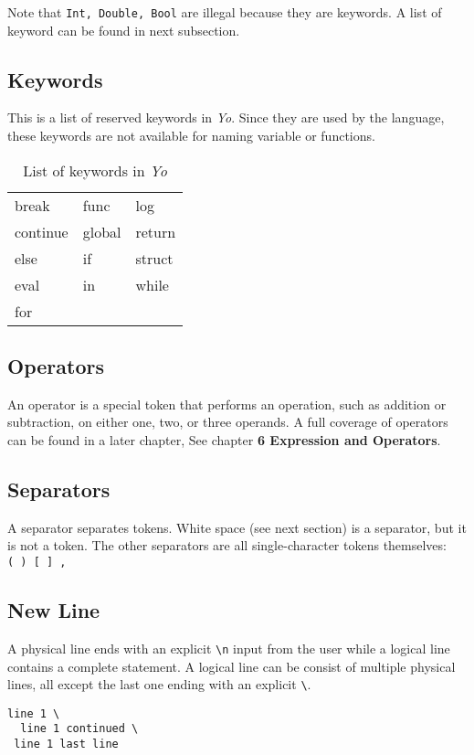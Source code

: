\documentclass[11pt]{article}
\begin{document}
Note that \texttt{Int, Double, Bool} are illegal because they are keywords. A list of keyword can be found in next subsection.

\subsection{Keywords} %
This is a list of reserved keywords in \textit{Yo}. Since they are used by the language, these keywords are not available for naming variable or functions.\\
\begin{table}[htb!]
\centering
\caption{List of keywords in \textit{Yo}}
\begin{tabular}{lll}
break   & func   & log  \\
continue & global & return  \\
else  & if     & struct \\
eval   & in     & while  \\
for  & &
\end{tabular}
\end{table}

\subsection{Operators} %
An operator is a special token that performs an operation, such as addition or subtraction, on either one, two, or three operands. A full coverage of operators can be found in a later chapter, See chapter \textbf{6 Expression and Operators}.

\subsection{Separators} %
A separator separates tokens. White space (see next section) is a separator, but it is not a token. The other separators are all single-character tokens themselves: \\
\texttt{( ) [ ] ,} \\

\subsection{New Line}
A physical line ends with an explicit \texttt{\textbackslash n} input from the user while a logical line contains a complete statement. A logical line can be consist of multiple physical lines, all except the last one ending with an explicit \texttt{\textbackslash}.
\begin{lstlisting}
line 1 \
  line 1 continued \
 line 1 last line
\end{lstlisting}
\end{document}
